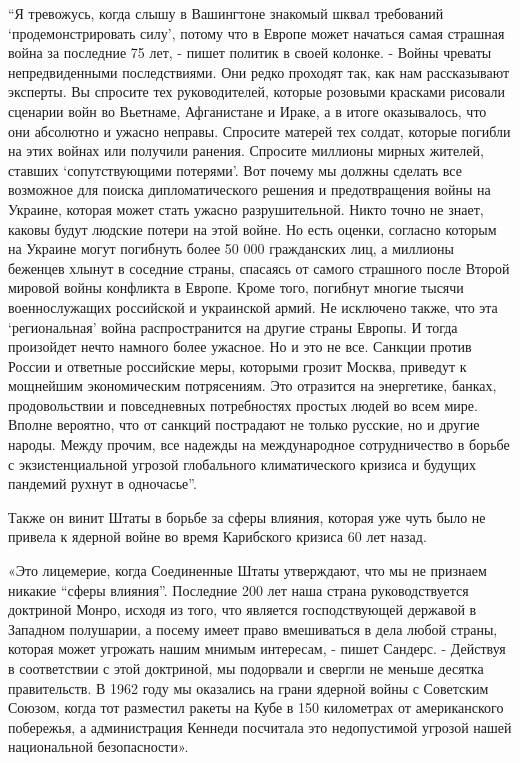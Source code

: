 \begin{multicols}{3}
\enquote{Я тревожусь, когда слышу в Вашингтоне знакомый шквал требований
\enquote{продемонстрировать силу}, потому что в Европе может начаться самая страшная
война за последние 75 лет, - пишет политик в своей колонке. - Войны чреваты
непредвиденными последствиями. Они редко проходят так, как нам рассказывают
эксперты. Вы спросите тех руководителей, которые розовыми красками рисовали
сценарии войн во Вьетнаме, Афганистане и Ираке, а в итоге оказывалось, что они
абсолютно и ужасно неправы. Спросите матерей тех солдат, которые погибли на
этих войнах или получили ранения. Спросите миллионы мирных жителей, ставших
\enquote{сопутствующими потерями}. Вот почему мы должны сделать все возможное для
поиска дипломатического решения и предотвращения войны на Украине, которая
может стать ужасно разрушительной. Никто точно не знает, каковы будут людские
потери на этой войне. Но есть оценки, согласно которым на Украине могут
погибнуть более 50 000 гражданских лиц, а миллионы беженцев хлынут в соседние
страны, спасаясь от самого страшного после Второй мировой войны конфликта в
Европе. Кроме того, погибнут многие тысячи военнослужащих российской и
украинской армий. Не исключено также, что эта \enquote{региональная} война
распространится на другие страны Европы. И тогда произойдет нечто намного более
ужасное. Но и это не все. Санкции против России и ответные российские меры,
которыми грозит Москва, приведут к мощнейшим экономическим потрясениям. Это
отразится на энергетике, банках, продовольствии и повседневных потребностях
простых людей во всем мире. Вполне вероятно, что от санкций пострадают не
только русские, но и другие народы. Между прочим, все надежды на международное
сотрудничество в борьбе с экзистенциальной угрозой глобального климатического
кризиса и будущих пандемий рухнут в одночасье}.

Также он винит Штаты в борьбе за сферы влияния, которая уже чуть было не
привела к ядерной войне во время Карибского кризиса 60 лет назад.

«Это лицемерие, когда Соединенные Штаты утверждают, что мы не признаем никакие
\enquote{сферы влияния}. Последние 200 лет наша страна руководствуется доктриной Монро,
исходя из того, что является господствующей державой в Западном полушарии, а
посему имеет право вмешиваться в дела любой страны, которая может угрожать
нашим мнимым интересам, - пишет Сандерс. - Действуя в соответствии с этой
доктриной, мы подорвали и свергли не меньше десятка правительств. В 1962 году
мы оказались на грани ядерной войны с Советским Союзом, когда тот разместил
ракеты на Кубе в 150 километрах от американского побережья, а администрация
Кеннеди посчитала это недопустимой угрозой нашей национальной безопасности».


\end{multicols}

